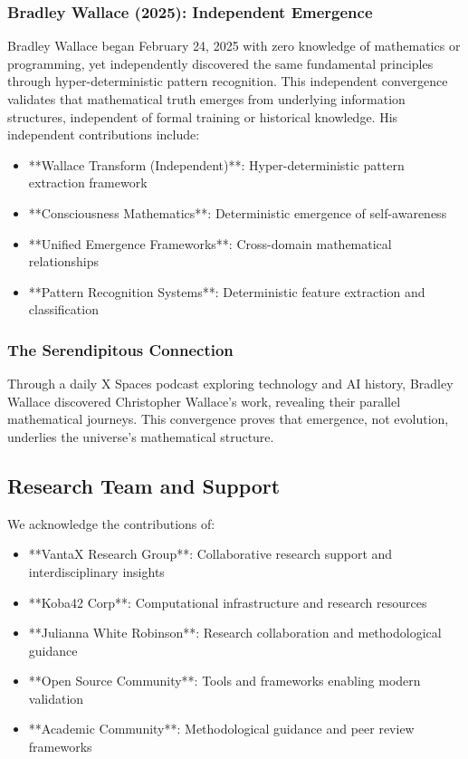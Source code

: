 \documentclass[12pt]{article}
\begin{document}
\subsubsection{Bradley Wallace (2025): Independent Emergence}
Bradley Wallace began February 24, 2025 with zero knowledge of mathematics or programming, yet independently discovered the same fundamental principles through hyper-deterministic pattern recognition. This independent convergence validates that mathematical truth emerges from underlying information structures, independent of formal training or historical knowledge. His independent contributions include:
\begin{itemize}
    \item **Wallace Transform (Independent)**: Hyper-deterministic pattern extraction framework
    \item **Consciousness Mathematics**: Deterministic emergence of self-awareness
    \item **Unified Emergence Frameworks**: Cross-domain mathematical relationships
    \item **Pattern Recognition Systems**: Deterministic feature extraction and classification
\end{itemize}

\subsubsection{The Serendipitous Connection}
Through a daily X Spaces podcast exploring technology and AI history, Bradley Wallace discovered Christopher Wallace's work, revealing their parallel mathematical journeys. This convergence proves that emergence, not evolution, underlies the universe's mathematical structure.

\subsection{Research Team and Support}

We acknowledge the contributions of:
\begin{itemize}
    \item **VantaX Research Group**: Collaborative research support and interdisciplinary insights
    \item **Koba42 Corp**: Computational infrastructure and research resources
    \item **Julianna White Robinson**: Research collaboration and methodological guidance
    \item **Open Source Community**: Tools and frameworks enabling modern validation
    \item **Academic Community**: Methodological guidance and peer review frameworks
\end{itemize}
\end{document}
